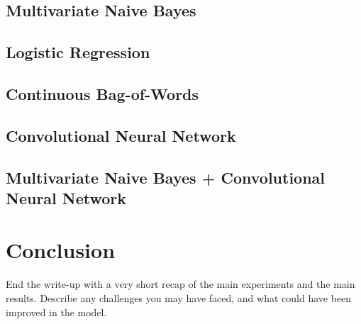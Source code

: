 \documentclass[11pt]{article}
\begin{document}
\subsection{Multivariate Naive Bayes} 

\subsection{Logistic Regression}

\subsection{Continuous Bag-of-Words}

\subsection{Convolutional Neural Network}

\subsection{Multivariate Naive Bayes + Convolutional Neural Network}




\section{Conclusion}

End the write-up with a very short recap of the main experiments and the main results. Describe any challenges you may have faced, and what could have been improved in the model.



\end{document}
